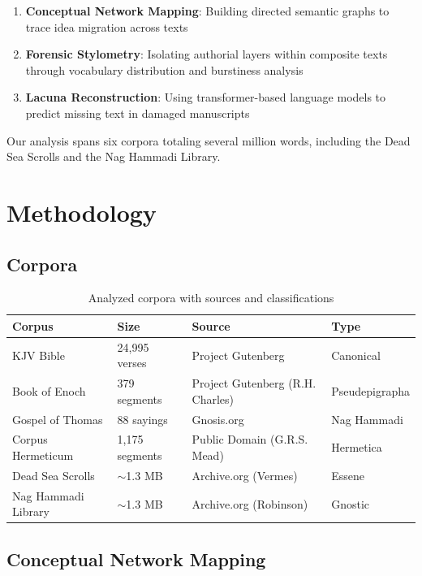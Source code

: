\documentclass[11pt]{article}
\begin{document}
\begin{enumerate}
    \item \textbf{Conceptual Network Mapping}: Building directed semantic graphs to trace idea migration across texts
    \item \textbf{Forensic Stylometry}: Isolating authorial layers within composite texts through vocabulary distribution and burstiness analysis
    \item \textbf{Lacuna Reconstruction}: Using transformer-based language models to predict missing text in damaged manuscripts
\end{enumerate}

Our analysis spans six corpora totaling several million words, including the Dead Sea Scrolls and the Nag Hammadi Library.

\section{Methodology}

\subsection{Corpora}

\begin{table}[h]
\centering
\begin{tabular}{@{}llll@{}}
\toprule
Corpus & Size & Source & Type \\
\midrule
KJV Bible & 24,995 verses & Project Gutenberg & Canonical \\
Book of Enoch & 379 segments & Project Gutenberg (R.H. Charles) & Pseudepigrapha \\
Gospel of Thomas & 88 sayings & Gnosis.org & Nag Hammadi \\
Corpus Hermeticum & 1,175 segments & Public Domain (G.R.S. Mead) & Hermetica \\
Dead Sea Scrolls & $\sim$1.3 MB & Archive.org (Vermes) & Essene \\
Nag Hammadi Library & $\sim$1.3 MB & Archive.org (Robinson) & Gnostic \\
\bottomrule
\end{tabular}
\caption{Analyzed corpora with sources and classifications}
\end{table}

\subsection{Conceptual Network Mapping}
\end{document}
